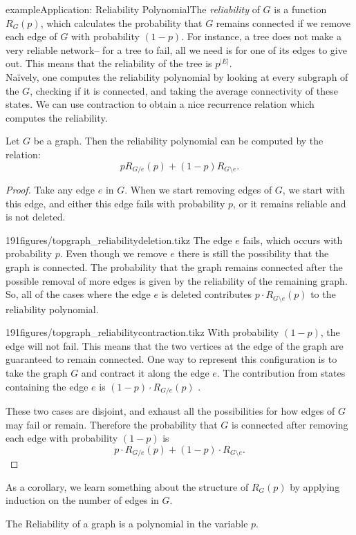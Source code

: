 \begin{framedpage}{example}{Application: Reliability Polynomial}{The \emph{reliability} of $G$ is a function $R_G(p)$, which calculates the probability that $G$ remains connected if we remove each edge of $G$ with probability $(1-p)$.}%
%
\label{sec:topgraph:reliability}%
 For instance, a tree does not make a very reliable network-- for a tree to fail, all we need is for one of its edges to give out. This means that the reliability of the tree is $p^{|E|}$.\\
Na\"ively, one computes the reliability polynomial by looking at every subgraph of the $G$, checking if it is connected, and taking the average connectivity of these states.
We can use contraction to obtain a nice recurrence relation which computes the reliability. 
\begin{prop}%
Let $G$ be a graph. Then the reliability polynomial can be computed by the relation:
 \[pR_{G/e}(p)+(1-p)R_{G\setminus e}.\] 
\end{prop}
\begin{proof}
 Take any edge $e$ in $G$. When we start removing edges of $G$, we start with this edge, and either this edge fails with probability $p$, or it remains reliable and is not deleted.
\begin{paragraphfigureenv}{191figures/topgraph_reliabilitydeletion.tikz}
  The edge $e$ fails, which occurs with probability $p$. Even though we remove $e$ there is still the possibility that the graph is connected. 
  The probability that the graph remains connected after the possible removal of more edges is given by the reliability of the remaining graph. So, all of the  cases where the edge $e$ is deleted contributes  $p\cdot R_{G\setminus e}(p)$ to the reliability polynomial. 
\end{paragraphfigureenv}
  
\begin{paragraphfigureenv}{191figures/topgraph_reliabilitycontraction.tikz} With probability $(1-p)$, the edge will not fail. This means that the two vertices at the edge of the graph are guaranteed to remain connected. One way to represent this configuration is to take the graph $G$ and contract it along the edge $e$.  The contribution from states containing the edge $e$ is $(1-p)\cdot R_{G/e}(p)$ .
\end{paragraphfigureenv}

These two cases are disjoint, and exhaust all the possibilities for how edges of $G$ may fail or remain. Therefore the probability that $G$ is connected after removing each edge with probability $(1-p)$ is 
\[p\cdot R_{G/e}(p)+(1-p)\cdot R_{G\setminus e}.\] 
\end{proof}

As a corollary, we learn something about the structure of $R_G(p)$ by applying induction on the number of edges in $G$. 
\begin{corollary}
The Reliability of a graph is a polynomial in the variable $p$. 
\end{corollary}
\end{framedpage}